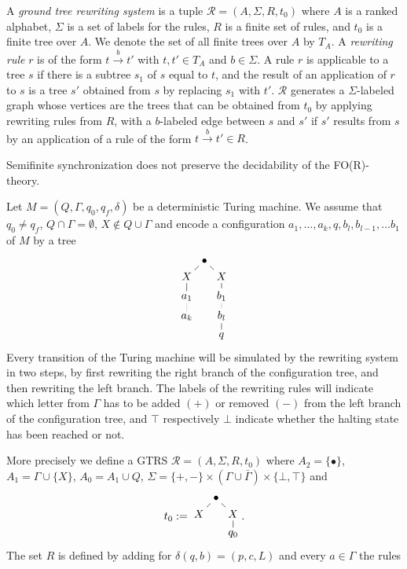 \documentclass{LMCS}
\begin{document}
A \emph{ground tree rewriting system} is a tuple $\mathcal R=(A, \Sigma, R, t_0)$
where $A$ is a ranked alphabet, $\Sigma$ is a set of labels for the 
rules, $R$ is a finite set of rules, and $t_0$ is a finite tree over $A$.
We denote the set of all finite trees over $A$ by $T_A$. A \emph{rewriting rule}
$r$ is of the form $t \xrightarrow{b} t'$ with $t,t' \in T_A$ and $b \in \Sigma$.
A rule $r$ is applicable to a tree $s$ if there is a subtree $s_1$ of $s$ equal to $t$,
and the result of an application of $r$ to $s$ is a tree $s'$ obtained from $s$
by replacing $s_1$ with $t'$. $\mathcal R$ generates a $\Sigma$-labeled graph 
whose vertices are the trees that can be obtained from $t_0$ by applying 
rewriting rules from $R$, with a $b$-labeled edge between $s$ and $s'$ if
$s'$ results from $s$ by an application of a rule of the form  $t \xrightarrow{b} t' \in R$.

\begin{thm}\label{theo:semi-undec}
Semifinite synchronization does not preserve the decidability of 
the FO(R)-theory.
\end{thm}

\proof
Let $M=(Q,\Gamma,q_0,q_f,\delta)$ be a deterministic Turing machine.
We assume that $q_0 \neq q_f$, $Q \cap \Gamma =\emptyset$, $X \notin Q \cup \Gamma$  and
encode a configuration $a_1,\ldots, a_k, q, b_l, b_{l-1}, \ldots b_1$ of $M$ 
by a tree 
\[\xymatrix@R=0.3pc@C=0.2pc{ 
  & \bullet \ar@{-}[dl] \ar@{-}[dr] & \\
  X \ar@{-}[d] && X\ar@{-}[d] \\
  a_1 \ar@{..}[d] && b_1 \ar@{..}[d] \\ 
  a_k && b_l \ar@{-}[d] \\
  && q}
\]
Every transition of the Turing machine will be simulated by the
rewriting system in two steps, by first rewriting the right branch of
the configuration tree, and then rewriting the left branch.
The labels of the rewriting rules will indicate which letter from 
$\Gamma$ has to be added $(+)$ or removed $(-)$ from the left branch of
the configuration tree, and $\top$ respectively $\bot$ indicate
whether the halting state has been reached or not.

More precisely we define a GTRS $\mathcal R=(A,\Sigma,R,t_0)$
where $A_2=\{\bullet\}$, $A_1=\Gamma \cup \{X\}$, $A_0= A_1 \cup Q$,
$\Sigma = \{+,-\} \times (\Gamma \cup \bar \Gamma) \times\{\bot, \top\}$ and
\[t_0:=\vcenter{\xymatrix@R=0.3pc@C=0.2pc{ & \bullet \ar@{-}[dl] \ar@{-}[dr] & \\ X  && X \ar@{-}[d] \\ && q_0}}.\]
The set $R$ is defined by adding for $\delta(q,b)=(p,c,L)$ and 
every $a \in \Gamma$ the rules
\end{document}
